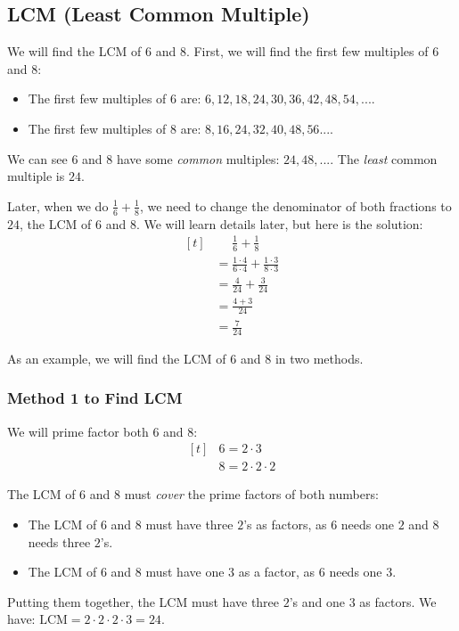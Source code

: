 \subsection{LCM (Least Common Multiple)}
We will find the LCM of $6$ and $8$. First, we will find the first few multiples of $6$ and $8$:
\begin{itemize}
\item The first few multiples of $6$ are: $6,12,18,24,30,36,42,48,54,...$.
\item The first few multiples of $8$ are: $8,16,24,32,40,48,56...$.
\end{itemize}

We can see $6$ and $8$ have some \textit{common} multiples: $24,48,...$. The \textit{least} common multiple is $24$.

Later, when we do $\frac{1}{6}+\frac{1}{8}$, we need to change the denominator of both fractions to $24$, the LCM of $6$ and $8$. We will learn details later, but here is the solution:
\[
\begin{aligned}[t]
   &\phantom{{}=}\frac{1}{6}+\frac{1}{8} \\
   &= \frac{1\cdot4}{6\cdot4}+\frac{1\cdot3}{8\cdot3} \\
   &= \frac{4}{24}+\frac{3}{24} \\
   &= \frac{4+3}{24} \\
   &= \frac{7}{24}
\end{aligned}
\]

As an example, we will find the LCM of $6$ and $8$ in two methods.
\subsubsection{Method 1 to Find LCM}
We will prime factor both $6$ and $8$:
\[
\begin{aligned}[t]
&6=2\cdot3 \\
&8=2\cdot2\cdot2
\end{aligned}
\]

The LCM of $6$ and $8$ must \textit{cover} the prime factors of both numbers:
\begin{itemize}
\item The LCM of $6$ and $8$ must have three $2$'s as factors, as $6$ needs one $2$ and $8$ needs three $2$'s.
\item The LCM of $6$ and $8$ must have one $3$ as a factor, as $6$ needs one $3$.
\end{itemize}
Putting them together, the LCM must have three $2$'s and one $3$ as factors. We have: $\text{LCM}=2\cdot2\cdot2\cdot3=24$.

